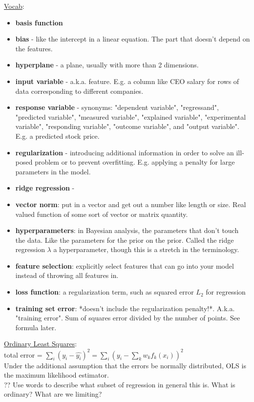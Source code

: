 \underline{Vocab}:
\begin{itemize}
	\item \textbf{basis function}
	\item \textbf{bias} - like the intercept in a linear equation.  The part that doesn't depend on the features. 
	\item \textbf{hyperplane} - a plane, usually with more than 2 dimensions. 
	\item \textbf{input variable} - a.k.a. feature.  %
		E.g. a column like CEO salary for rows of data corresponding to different companies.
	\item \textbf{response variable} - synonyms: "dependent variable", "regressand", "predicted variable", "measured variable", "explained variable", "experimental variable", "responding variable", "outcome variable", and "output variable".   E.g. a predicted stock price.   
	\item \textbf{regularization} -  introducing additional information in order to solve an ill-posed problem or to prevent overfitting. 
	E.g. applying a penalty for large parameters in the model. 
	\item \textbf{ridge regression} - 
	\item \textbf{vector norm}: put in a vector and get out a number like length or size.  Real valued function of some sort of vector or matrix quantity. 
	\item \textbf{hyperparameters}: in Bayesian analysis, the parameters that don't touch the data.  Like the parameters for the prior on the prior.  Called the ridge regression $\lambda$ a hyperparameter, though this is a stretch in the terminology. 
	\item \textbf{feature selection}: explicitly select features that can go into your model instead of throwing all features in. 
	\item \textbf{loss function}: a regularization term, such as squared error $L_2$ for regression
	\item \textbf{training set error}:  *doesn't include the regularization penalty!*.  A.k.a. "training error".  
			Sum of squares error divided by the number of points.   See formula later. 
\end{itemize}

\underline{Ordinary Least Squares}: \hfill \\
total error = $\displaystyle \sum_i (y_i-\hat{y_i})^2 = \sum_i(y_i - \sum_k w_k f_k(x_i))^2$ \hfill \\
Under the additional assumption that the errors be normally distributed, OLS is the maximum likelihood estimator. \hfill \\ %
?? Use words to describe what subset of regression in general this is.  What is ordinary? What are we limiting?  \hfill \\
 \hfill \\

